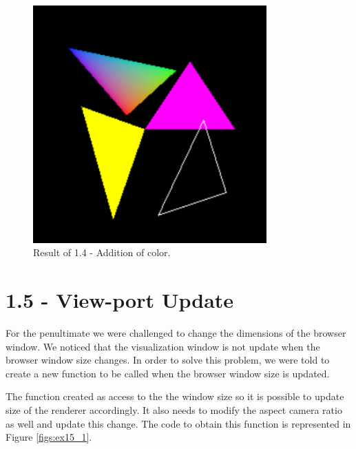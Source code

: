 \documentclass[12pt]{article}
\begin{document}
\begin{figure}[h!]
    \centering
        \includegraphics[height = 0.3\textheight, width = 0.8\textwidth]{figs/ex14_result.png}
        \caption{Result of 1.4 - Addition of color.}
        \label{figs:ex14_result}
\end{figure}

\section*{1.5 - View-port Update}
\label{ex_15}

For the penultimate we were challenged to change the dimensions of the browser window. We noticed that the visualization window is not update when the browser window size changes. In order to solve this problem, we were told to create a new function to be called when the browser window size is updated.\par

The function created as access to the the window size so it is possible to update size of the renderer accordingly. It also needs to modify the aspect camera ratio as well and update this change. The code to obtain this function is represented in Figure \ref{figs:ex15_1}.
\end{document}
